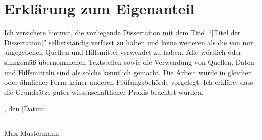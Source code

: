 \chapter{Erklärung zum Eigenanteil}\label{eigenanteil}
Ich versichere hiermit, die vorliegende Dissertation mit dem Titel
\enquote{[Titel der Dissertation]} selbstständig verfasst zu haben und keine weiteren als
die von mir angegebenen Quellen und Hilfsmittel verwendet zu haben.
Alle wörtlich oder sinngemäß übernommenen Textstellen sowie die Verwendung von
Quellen, Daten und Hilfsmitteln sind als solche kenntlich gemacht. Die Arbeit wurde in
gleicher oder ähnlicher Form keiner anderen Prüfungsbehörde vorgelegt.
Ich erkläre, dass die Grundsätze guter wissenschaftlicher Praxis beachtet wurden.

\vspace{2cm}

\noindent [Ort], den [Datum]

\vspace{2cm}

\noindent\rule{6cm}{0.4pt}

\noindent Max Mustermann

